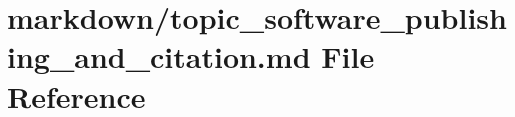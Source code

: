 \hypertarget{topic__software__publishing__and__citation_8md}{}\section{markdown/topic\+\_\+software\+\_\+publishing\+\_\+and\+\_\+citation.md File Reference}
\label{topic__software__publishing__and__citation_8md}
